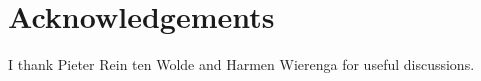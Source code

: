 \section*{Acknowledgements}

I thank Pieter Rein ten Wolde and Harmen Wierenga for useful discussions.






